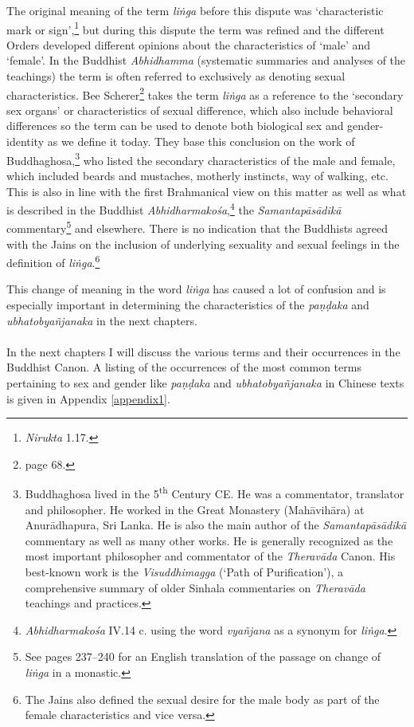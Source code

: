 The original meaning of the term {\em liṅga} before this dispute was `characteristic mark or sign',\footnote{{\em Nirukta} 1.17.} but during this dispute the term was refined and the different Orders developed different opinions about the characteristics of `male' and `female'. In the Buddhist {\em Abhidhamma} (systematic summaries and analyses of the teachings) the term is often referred to exclusively as denoting sexual characteristics. Bee Scherer\footnote{\cite{scherer} page 68.} takes the term {\em liṅga} as a reference to the `secondary sex organs' or characteristics of sexual difference, which also include behavioral differences so the term can be used to denote both biological sex and gender-identity as we define it today. They base this conclusion on the work of Buddhaghosa,\footnote{Buddhaghosa lived in the 5\textsuperscript{th} Century CE. He was a commentator, translator and philosopher. He worked in the Great Monastery (Mahāvihāra) at Anurādhapura, Sri Lanka. He is also the main author of the {\em Samantapāsādikā} commentary as well as many other works. He is generally recognized as the most important philosopher and commentator of the {\em Theravāda} Canon. His best-known work is the {\em Visuddhimagga} (`Path of Purification'), a comprehensive summary of older Sinhala commentaries on {\em Theravāda} teachings and practices.} who listed the secondary characteristics of the male and female, which included beards and mustaches, motherly instincts, way of walking, etc. This is also in line with the first Brahmanical view on this matter as well as what is described in the Buddhist {\em Abhidharmakośa},\footnote{{\em Abhidharmakośa} IV.14 c. using the word {\em vyañjana} as a synonym for {\em liṅga}.} the {\em Samantapāsādikā} commentary\footnote{See \cite{anderson2016} pages 237–240 for an English translation of the passage on change of {\em liṅga} in a monastic.} and elsewhere. There is no indication that the Buddhists agreed with the Jains on the inclusion of underlying sexuality and sexual feelings in the definition of {\em liṅga}.\footnote{The Jains also defined the sexual desire for the male body as part of the female characteristics and vice versa.}

This change of meaning in the word {\em liṅga} has caused a lot of confusion and is especially important in determining the characteristics of the {\em paṇḍaka} and {\em ubhatob­yañ­janaka} in the next chapters.\\
\\
In the next chapters I will discuss the various terms and their occurrences in the Buddhist Canon. A listing of the occurrences of the most common terms pertaining to sex and gender like {\em paṇḍaka} and {\em ubhatob­yañ­janaka} in Chinese texts is given in Appendix \ref{appendix1}. 
